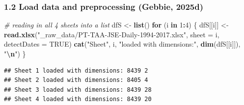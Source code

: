 \documentclass[
  12pt,
]{article}
\newenvironment{Shaded}{\begin{snugshade}}{\end{snugshade}}
\newcommand{\AttributeTok}[1]{\textcolor[rgb]{0.13,0.29,0.53}{#1}}
\newcommand{\CommentTok}[1]{\textcolor[rgb]{0.56,0.35,0.01}{\textit{#1}}}
\newcommand{\ConstantTok}[1]{\textcolor[rgb]{0.56,0.35,0.01}{#1}}
\newcommand{\ControlFlowTok}[1]{\textcolor[rgb]{0.13,0.29,0.53}{\textbf{#1}}}
\newcommand{\DecValTok}[1]{\textcolor[rgb]{0.00,0.00,0.81}{#1}}
\newcommand{\FunctionTok}[1]{\textcolor[rgb]{0.13,0.29,0.53}{\textbf{#1}}}
\newcommand{\NormalTok}[1]{#1}
\newcommand{\OtherTok}[1]{\textcolor[rgb]{0.56,0.35,0.01}{#1}}
\newcommand{\SpecialCharTok}[1]{\textcolor[rgb]{0.81,0.36,0.00}{\textbf{#1}}}
\newcommand{\StringTok}[1]{\textcolor[rgb]{0.31,0.60,0.02}{#1}}
\begin{document}
\subsubsection{1.2 Load data and preprocessing (Gebbie,
2025d)}\label{load-data-and-preprocessing-tim_prep}

\begin{Shaded}
\begin{Highlighting}[]
\CommentTok{\# reading in all 4 sheets into a list}
\NormalTok{dfS }\OtherTok{\textless{}{-}} \FunctionTok{list}\NormalTok{()}
\ControlFlowTok{for}\NormalTok{ (i }\ControlFlowTok{in} \DecValTok{1}\SpecialCharTok{:}\DecValTok{4}\NormalTok{) \{}
\NormalTok{  dfS[[i]] }\OtherTok{\textless{}{-}} \FunctionTok{read.xlsx}\NormalTok{(}\StringTok{"\_raw\_data/PT{-}TAA{-}JSE{-}Daily{-}1994{-}2017.xlsx"}\NormalTok{, }\AttributeTok{sheet =}\NormalTok{ i, }\AttributeTok{detectDates =} \ConstantTok{TRUE}\NormalTok{)}
  \FunctionTok{cat}\NormalTok{(}\StringTok{"Sheet"}\NormalTok{, i, }\StringTok{"loaded with dimensions:"}\NormalTok{, }\FunctionTok{dim}\NormalTok{(dfS[[i]]), }\StringTok{"}\SpecialCharTok{\textbackslash{}n}\StringTok{"}\NormalTok{)}
\NormalTok{\}}
\end{Highlighting}
\end{Shaded}

\begin{verbatim}
## Sheet 1 loaded with dimensions: 8439 2 
## Sheet 2 loaded with dimensions: 8405 4 
## Sheet 3 loaded with dimensions: 8439 28 
## Sheet 4 loaded with dimensions: 8439 20
\end{verbatim}
\end{document}
